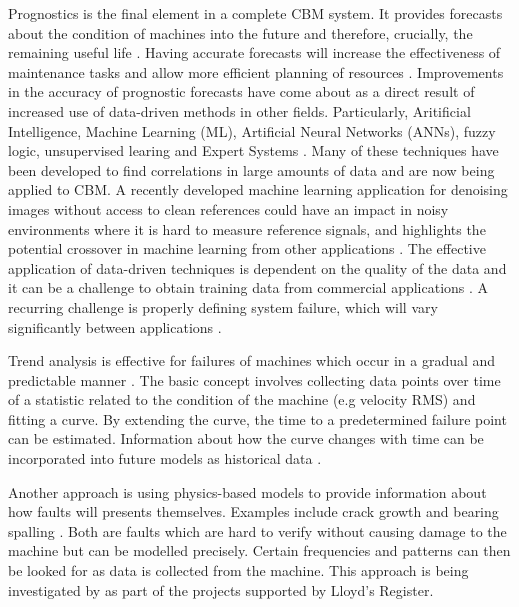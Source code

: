 Prognostics is the final element in a complete CBM system.
It provides forecasts about the condition of machines into the future and therefore, crucially, the remaining useful life \cite{CM_randall}.
Having accurate forecasts will increase the effectiveness of maintenance tasks and allow more efficient planning of resources \cite{CBM_overview}.
Improvements in the accuracy of prognostic forecasts have come about as a direct result of increased use of data-driven methods in other fields.
Particularly, Aritificial Intelligence, Machine Learning (ML), Artificial Neural Networks (ANNs), fuzzy logic, unsupervised learing and Expert Systems \cite{CM_dai_gao_2013}.
Many of these techniques have been developed to find correlations in large amounts of data and are now being applied to CBM.
A recently developed machine learning application for denoising images without access to clean references could have an impact in noisy environments where it is hard to measure reference signals, and highlights the potential crossover in machine learning from other applications \cite{Noise2Noise}.
The effective application of data-driven techniques is dependent on the quality of the data and it can be a challenge to obtain training data from commercial applications \cite{CBM_overview}.
A recurring challenge is properly defining system failure, which will vary significantly between applications \cite{CBM_overview}\cite{CM_dai_gao_2013}.
\par

Trend analysis is effective for failures of machines which occur in a gradual and predictable manner \cite{CM_randall}.
The basic concept involves collecting data points over time of a statistic related to the condition of the machine (e.g velocity RMS) and fitting a curve.
By extending the curve, the time to a predetermined failure point can be estimated.
Information about how the curve changes with time can be incorporated into future models as historical data \cite{CBM_overview}.
\par

Another approach is using physics-based models to provide information about how faults will presents themselves.
Examples include crack growth and bearing spalling \cite{CM_randall}.
Both are faults which are hard to verify without causing damage to the machine but can be modelled precisely.
Certain frequencies and patterns can then be looked for as data is collected from the machine.
This approach is being investigated by as part of the projects supported by Lloyd's Register.
\par

